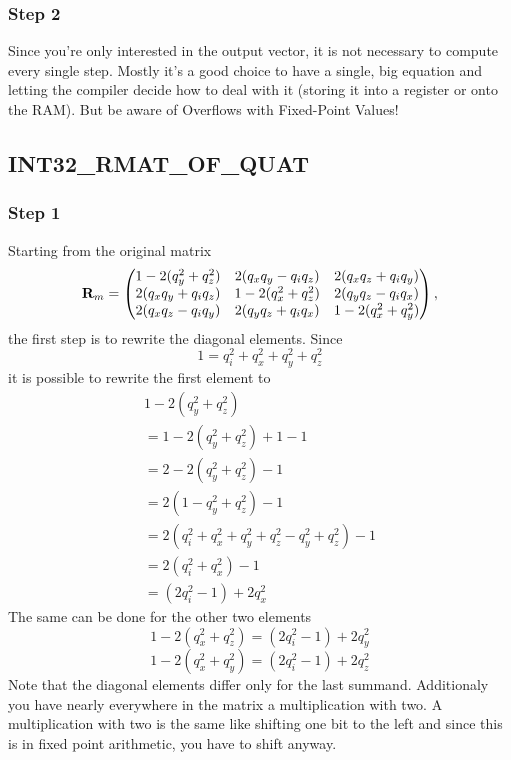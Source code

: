 \subsubsection*{Step 2}
Since you're only interested in the output vector, it is not necessary to compute every single step. Mostly it's a good choice to have a single, big equation and letting the compiler decide how to deal with it (storing it into a register or onto the RAM). But be aware of Overflows with Fixed-Point Values!

\subsection*{INT32\_RMAT\_OF\_QUAT}
\subsubsection*{Step 1}
Starting from the original matrix
\begin{equation}
\mathbf{R}_m = \begin{pmatrix}
1-2(q_y^2 + q_z^2)		& 2(q_xq_y-q_iq_z)		& 2(q_xq_z + q_iq_y) \\
2(q_xq_y + q_iq_z)		& 1-2(q_x^2 + q_z^2)	& 2(q_yq_z - q_iq_x) \\
2(q_xq_z - q_iq_y)		& 2(q_yq_z+q_iq_x)		& 1-2(q_x^2 + q_y^2)	
\end{pmatrix},
\end{equation}
the first step is to rewrite the diagonal elements. Since
\begin{equation}
1 = q_i^2+q_x^2+q_y^2+q_z^2
\end{equation}
it is possible to rewrite the first element to
\begin{eqnarray}
1-2(q_y^2 + q_z^2) \\
= 1-2(q_y^2 + q_z^2) +1-1 \\
= 2-2(q_y^2 + q_z^2)-1 \\
= 2(1 - q_y^2 + q_z^2)-1 \\
= 2(q_i^2+q_x^2+q_y^2+q_z^2 - q_y^2 + q_z^2)-1 \\
= 2(q_i^2+q_x^2)-1 \\
= (2q_i^2-1)+2q_x^2
\end{eqnarray}
The same can be done for the other two elements
\begin{equation}
1-2(q_x^2 + q_z^2) = (2q_i^2-1)+2q_y^2
\end{equation}
\begin{equation}
1-2(q_x^2 + q_y^2) = (2q_i^2-1)+2q_z^2
\end{equation}
Note that the diagonal elements differ only for the last summand. Additionaly you have nearly everywhere in the matrix a multiplication with two. A multiplication with two is the same like shifting one bit to the left and since this is in fixed point arithmetic, you have to shift anyway.
